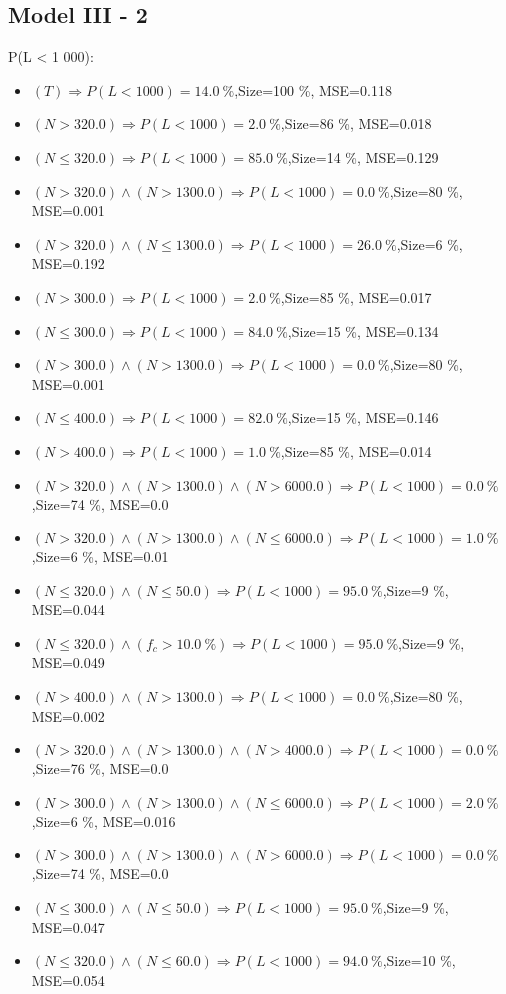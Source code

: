 \documentclass[numbered]{CSL}
\begin{document}
\subsection{Model III - 2}
P(L < 1 000):
\begin{itemize}
\item $(T) \Rightarrow P(L < 1 000) = 14.0~\%$,\hfill Size=100 \%, MSE=0.118
\item $(N > 320.0) \Rightarrow P(L < 1 000) = 2.0~\%$,\hfill Size=86 \%, MSE=0.018
\item $(N \leq 320.0) \Rightarrow P(L < 1 000) = 85.0~\%$,\hfill Size=14 \%, MSE=0.129
\item $(N > 320.0) \land (N > 1300.0) \Rightarrow P(L < 1 000) = 0.0~\%$,\hfill Size=80 \%, MSE=0.001
\item $(N > 320.0) \land (N \leq 1300.0) \Rightarrow P(L < 1 000) = 26.0~\%$,\hfill Size=6 \%, MSE=0.192
\item $(N > 300.0) \Rightarrow P(L < 1 000) = 2.0~\%$,\hfill Size=85 \%, MSE=0.017
\item $(N \leq 300.0) \Rightarrow P(L < 1 000) = 84.0~\%$,\hfill Size=15 \%, MSE=0.134
\item $(N > 300.0) \land (N > 1300.0) \Rightarrow P(L < 1 000) = 0.0~\%$,\hfill Size=80 \%, MSE=0.001
\item $(N \leq 400.0) \Rightarrow P(L < 1 000) = 82.0~\%$,\hfill Size=15 \%, MSE=0.146
\item $(N > 400.0) \Rightarrow P(L < 1 000) = 1.0~\%$,\hfill Size=85 \%, MSE=0.014
\item $(N > 320.0) \land (N > 1300.0) \land (N > 6000.0) \Rightarrow P(L < 1 000) = 0.0~\%$,\hfill Size=74 \%, MSE=0.0
\item $(N > 320.0) \land (N > 1300.0) \land (N \leq 6000.0) \Rightarrow P(L < 1 000) = 1.0~\%$,\hfill Size=6 \%, MSE=0.01
\item $(N \leq 320.0) \land (N \leq 50.0) \Rightarrow P(L < 1 000) = 95.0~\%$,\hfill Size=9 \%, MSE=0.044
\item $(N \leq 320.0) \land (f_c > 10.0~\%) \Rightarrow P(L < 1 000) = 95.0~\%$,\hfill Size=9 \%, MSE=0.049
\item $(N > 400.0) \land (N > 1300.0) \Rightarrow P(L < 1 000) = 0.0~\%$,\hfill Size=80 \%, MSE=0.002
\item $(N > 320.0) \land (N > 1300.0) \land (N > 4000.0) \Rightarrow P(L < 1 000) = 0.0~\%$,\hfill Size=76 \%, MSE=0.0
\item $(N > 300.0) \land (N > 1300.0) \land (N \leq 6000.0) \Rightarrow P(L < 1 000) = 2.0~\%$,\hfill Size=6 \%, MSE=0.016
\item $(N > 300.0) \land (N > 1300.0) \land (N > 6000.0) \Rightarrow P(L < 1 000) = 0.0~\%$,\hfill Size=74 \%, MSE=0.0
\item $(N \leq 300.0) \land (N \leq 50.0) \Rightarrow P(L < 1 000) = 95.0~\%$,\hfill Size=9 \%, MSE=0.047
\item $(N \leq 320.0) \land (N \leq 60.0) \Rightarrow P(L < 1 000) = 94.0~\%$,\hfill Size=10 \%, MSE=0.054
\end{itemize}
\end{document}
